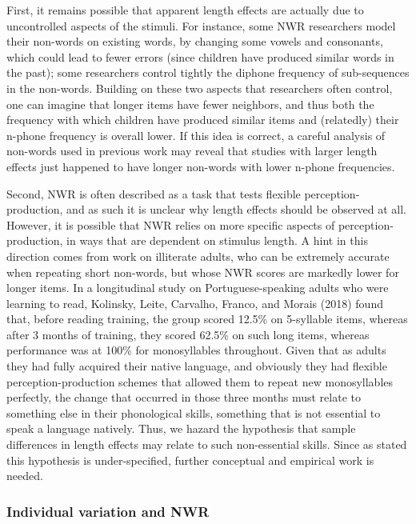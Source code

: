 \documentclass[
  english,
  ,man,floatsintext]{apa6}
\begin{document}
First, it remains possible that apparent length effects are actually due to uncontrolled aspects of the stimuli. For instance, some NWR researchers model their non-words on existing words, by changing some vowels and consonants, which could lead to fewer errors (since children have produced similar words in the past); some researchers control tightly the diphone frequency of sub-sequences in the non-words. Building on these two aspects that researchers often control, one can imagine that longer items have fewer neighbors, and thus both the frequency with which children have produced similar items and (relatedly) their n-phone frequency is overall lower. If this idea is correct, a careful analysis of non-words used in previous work may reveal that studies with larger length effects just happened to have longer non-words with lower n-phone frequencies.

Second, NWR is often described as a task that tests flexible perception-production, and as such it is unclear why length effects should be observed at all. However, it is possible that NWR relies on more specific aspects of perception-production, in ways that are dependent on stimulus length. A hint in this direction comes from work on illiterate adults, who can be extremely accurate when repeating short non-words, but whose NWR scores are markedly lower for longer items. In a longitudinal study on Portuguese-speaking adults who were learning to read, Kolinsky, Leite, Carvalho, Franco, and Morais (2018) found that, before reading training, the group scored 12.5\% on 5-syllable items, whereas after 3 months of training, they scored 62.5\% on such long items, whereas performance was at 100\% for monosyllables throughout. Given that as adults they had fully acquired their native language, and obviously they had flexible perception-production schemes that allowed them to repeat new monosyllables perfectly, the change that occurred in those three months must relate to something else in their phonological skills, something that is not essential to speak a language natively. Thus, we hazard the hypothesis that sample differences in length effects may relate to such non-essential skills. Since as stated this hypothesis is under-specified, further conceptual and empirical work is needed.

\hypertarget{individual-variation-and-nwr-1}{%
\subsubsection{Individual variation and NWR}\label{individual-variation-and-nwr-1}}
\end{document}

